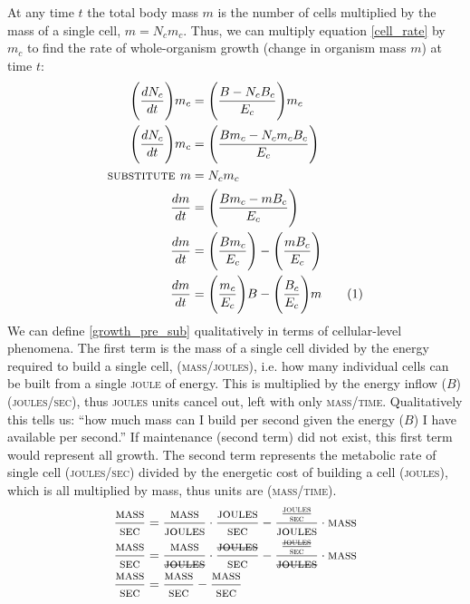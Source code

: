 \documentclass[a4paper]{article} %
\newcommand\numberthis{\addtocounter{equation}{1}\tag{\theequation}}
\begin{document}
At any time $t$ the total body mass $m$ is the number of cells multiplied by the mass of a single cell, $m = N_{c}m_{c}$. Thus, we can multiply equation \eqref{cell_rate} by $m_{c}$ to find the rate of whole-organism growth (change in organism mass $m$) at time $t$:
\begin{align*}
    \Bigg(\frac{dN_{c}}{dt}\Bigg)m_c &= \Bigg(\frac{B - N_{c}B_{c}}{E_{c}}\Bigg)m_c \\
    \Bigg(\frac{dN_{c}}{dt}\Bigg)m_c &= \Bigg(\frac{Bm_c - N_{c}m_{c}B_{c}}{E_c}\Bigg) \\
    \textsc{substitute } m &= N_{c}m_{c} \\
    \frac{dm}{dt} &= \Bigg(\frac{Bm_c - mB_{c}}{E_c}\Bigg) \\
    \frac{dm}{dt} &= \Bigg(\frac{Bm_c}{E_c}\Bigg) - \Bigg(\frac{mB_{c}}{E_c}\Bigg) \\
    \frac{dm}{dt} &= \Bigg(\frac{m_c}{E_c}\Bigg)B - \Bigg(\frac{B_{c}}{E_c}\Bigg)m \numberthis \label{growth_pre_sub}
\end{align*}
We can define \eqref{growth_pre_sub} qualitatively in terms of cellular-level phenomena. The first term is the mass of a single cell divided by the energy required to build a single cell, (\textsc{mass/joules}), i.e. how many individual cells can be built from a single \textsc{joule} of energy. This is multiplied by the energy inflow ($B$) (\textsc{joules/sec}), thus \textsc{joules} units cancel out, left with only \textsc{mass/time}. Qualitatively this tells us: ``how much mass can I build per second given the energy ($B$) I have available per second.'' If maintenance (second term) did not exist, this first term would represent all growth. The second term represents the metabolic rate of single cell (\textsc{joules/sec}) divided by the energetic cost of building a cell (\textsc{joules}), which is all multiplied by mass, thus units are (\textsc{mass/time}).
\begin{align*}
    \frac{\textsc{mass}}{\textsc{sec}} &= \frac{\textsc{mass}}{\textsc{joules}}\cdot\frac{\textsc{joules}}{\textsc{sec}} - \frac{\frac{\textsc{joules}}{\textsc{sec}}}{\textsc{joules}}\cdot\textsc{mass} \\
    \frac{\textsc{mass}}{\textsc{sec}} &= \frac{\textsc{mass}}{\textsc{\st{joules}}}\cdot\frac{\textsc{\st{joules}}}{\textsc{sec}} - \frac{\frac{\textsc{\st{joules}}}{\textsc{sec}}}{\textsc{\st{joules}}}\cdot\textsc{mass} \\
    \frac{\textsc{mass}}{\textsc{sec}} &= \frac{\textsc{mass}}{\textsc{sec}} - \frac{\textsc{mass}}{\textsc{sec}} \\
\end{align*}
\end{document}
